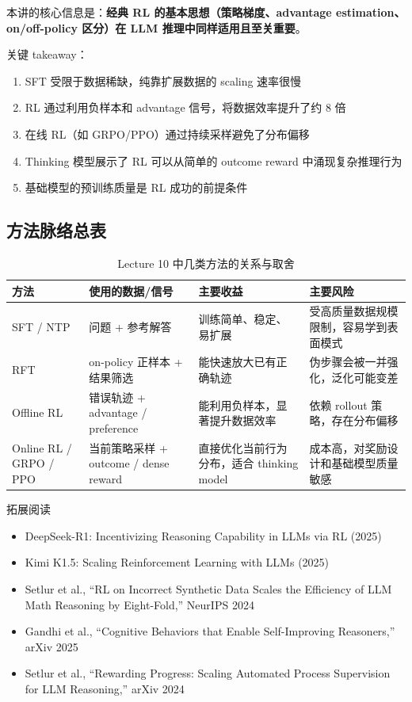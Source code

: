 \documentclass[a4paper]{article}
\begin{document}
本讲的核心信息是：\textbf{经典 RL 的基本思想（策略梯度、advantage estimation、on/off-policy 区分）在 LLM 推理中同样适用且至关重要}。

关键 takeaway：
\begin{enumerate}
    \item SFT 受限于数据稀缺，纯靠扩展数据的 scaling 速率很慢
    \item RL 通过利用负样本和 advantage 信号，将数据效率提升了约 8 倍
    \item 在线 RL（如 GRPO/PPO）通过持续采样避免了分布偏移
    \item Thinking 模型展示了 RL 可以从简单的 outcome reward 中涌现复杂推理行为
    \item 基础模型的预训练质量是 RL 成功的前提条件
\end{enumerate}

\subsection{方法脉络总表}

\begin{table}[H]
\centering
\begin{tabular}{p{} p{} p{} p{}}
\toprule
方法 & 使用的数据/信号 & 主要收益 & 主要风险 \\
\midrule
SFT / NTP & 问题 + 参考解答 & 训练简单、稳定、易扩展 & 受高质量数据规模限制，容易学到表面模式 \\
RFT & on-policy 正样本 + 结果筛选 & 能快速放大已有正确轨迹 & 伪步骤会被一并强化，泛化可能变差 \\
Offline RL & 错误轨迹 + advantage / preference & 能利用负样本，显著提升数据效率 & 依赖 rollout 策略，存在分布偏移 \\
Online RL / GRPO / PPO & 当前策略采样 + outcome / dense reward & 直接优化当前行为分布，适合 thinking model & 成本高，对奖励设计和基础模型质量敏感 \\
\bottomrule
\end{tabular}
\caption{Lecture 10 中几类方法的关系与取舍}
\end{table}

\begin{knowledgebox}{拓展阅读}
\begin{itemize}
    \item DeepSeek-R1: Incentivizing Reasoning Capability in LLMs via RL (2025)
    \item Kimi K1.5: Scaling Reinforcement Learning with LLMs (2025)
    \item Setlur et al., ``RL on Incorrect Synthetic Data Scales the Efficiency of LLM Math Reasoning by Eight-Fold,'' NeurIPS 2024
    \item Gandhi et al., ``Cognitive Behaviors that Enable Self-Improving Reasoners,'' arXiv 2025
    \item Setlur et al., ``Rewarding Progress: Scaling Automated Process Supervision for LLM Reasoning,'' arXiv 2024
\end{itemize}
\end{knowledgebox}
\end{document}
